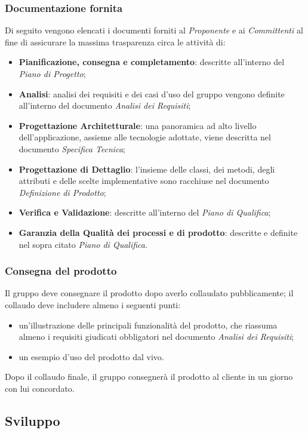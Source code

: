     \subsubsection{Documentazione fornita}
    Di seguito vengono elencati i documenti forniti al \textit{Proponente} e ai \textit{Committenti} al fine di assicurare la massima trasparenza circa le attività di:
    \begin{itemize}
    	\item \textbf{Pianificazione, consegna e completamento}: descritte all'interno del \textit{Piano di Progetto};
    	\item \textbf{Analisi}: analisi dei requisiti e dei casi d'uso del gruppo vengono definite all'interno del documento \textit{Analisi dei Requisiti};
    	\item \textbf{Progettazione Architetturale}: una panoramica ad alto livello dell'applicazione, assieme alle tecnologie adottate, viene descritta nel documento \textit{Specifica Tecnica};
    	\item \textbf{Progettazione di Dettaglio}: l'insieme delle classi, dei metodi, degli attributi e
delle scelte implementative sono racchiuse nel documento \textit{Definizione di Prodotto};
		\item \textbf{Verifica e Validazione}: descritte all'interno del \textit{Piano di Qualifica};
		\item \textbf{Garanzia della Qualità dei processi e di prodotto}: descritte e definite nel
sopra citato \textit{Piano di Qualifica}.
    \end{itemize}
    \subsubsection{Consegna del prodotto}
    Il gruppo deve consegnare il prodotto dopo averlo collaudato pubblicamente; il collaudo deve includere almeno i seguenti punti:
    \begin{itemize}
    	\item un'illustrazione delle principali funzionalità del prodotto, che riassuma almeno i requisiti giudicati obbligatori nel documento \textit{Analisi dei Requisiti};
    	\item un esempio d'uso del prodotto dal vivo.
    \end{itemize}
    Dopo il collaudo finale, il gruppo consegnerà il prodotto al cliente in un giorno con lui concordato.
	\subsection{Sviluppo}
